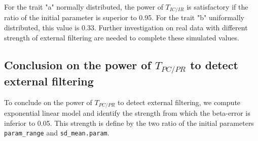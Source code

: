 \documentclass[12pt]{article}\usepackage[]{graphicx}\usepackage[]{color}
\begin{document}
For the trait "a" normally distributed, the power of $T_{IC/IR}$ is satisfactory if the ratio of the initial parameter is superior to
 0.95. For the trait "b" uniformally distributed, this value is 0.33. 
 Further investigation on real data with different strength of external filtering are needed to complete these simulated values.

 




  \subsection {Conclusion on the power of $T_{PC/PR}$ to detect external filtering}

To conclude on the power of $T_{PC/PR}$ to detect external filtering, we compute exponential linear model and identify the strength from which the beta-error is inferior to 0.05. This strength is define by the two ratio of the initial parameters \texttt{param\_range} and \texttt{sd\_mean.param}. 
\end{document}
